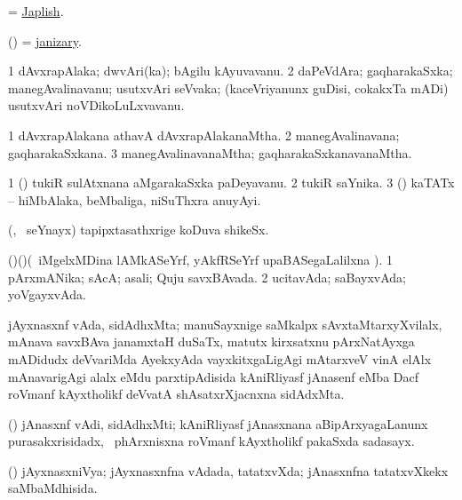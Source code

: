 \bentry
{}
\gl{\nA}
\bmng
=  \hyperlink{Japlish}{Japlish}. 
\emng
\eentry

\bentry
{}
\gl{\nA}
\bmng
(\ca) = \hyperlink{janizary}{janizary}. 
\emng
\eentry


\bentry
{}
\gl{\nA}
\bmng
\bnum
\num{1} dAvxrapAlaka; dwvAri(ka); bAgilu kAyuvavanu. 
\num{2} daPeVdAra; gaqharakaSxka; manegAvalinavanu; usutxvAri seVvaka; (kaceVriyanunx guDisi, cokakxTa mADi) usutxvAri noVDikoLuLxvavanu. 
\enum
\emng
\eentry

\bentry
{}
\gl{\gu}
\bmng
\bnum
\num{1} dAvxrapAlakana athavA dAvxrapAlakanaMtha. 
\num{2} manegAvalinavana; gaqharakaSxkana. 
\num{3} manegAvalinavanaMtha; gaqharakaSxkanavanaMtha. 
\enum
\emng
\eentry

\bentry
{}
\gl{\nA}
\bmng
\bnum
\num{1} (\ca) tukiR sulAtxnana aMgarakaSxka paDeyavanu. 
\num{2} tukiR saYnika. 
\num{3} (\rUpa) kaTATx -- hiMbAlaka, beMbaliga, niSuThxra anuyAyi. 
\enum
\emng
\eentry

\bentry
{}
\gl{\nA}
\bmng
(\ashi, \kanmu\ seYnayx) tapipxtasathxrige koDuva shikeSx. 
\emng
\eentry

\bentry
{}
\gl{\gu}
\bmng
(\birx)(\pArxM)(\kanmu\ iMgelxMDina lAMkASeYrf, yAkfRSeYrf upaBASegaLalilxna \parx). 
\bnum
\num{1} pArxmANika; sAcA; asali; Quju savxBAvada. 
\num{2} ucitavAda; saBayxvAda; yoVgayxvAda. 
\enum
\emng
\eentry

\bentry
{}
\gl{\nA}
\bmng
jAyxnasxnf vAda, sidAdhxMta; manuSayxnige saMkalpx sAvxtaMtarxyXvilalx, mAnava savxBAva janamxtaH duSaTx, matutx kirxsatxnu pArxNatAyxga mADidudx deVvariMda AyekxyAda vayxkitxgaLigAgi mAtarxveV vinA elAlx mAnavarigAgi alalx eMdu parxtipAdisida kAniRliyasf jAnasenf  eMba Dacf roVmanf kAyxtholikf deVvatA shAsatxrXjacnxna sidAdxMta. 
\emng
\eentry

\bentry
{}
\gl{\nA}
\bmng
(\ca) jAnasxnf vAdi, sidAdhxMti; kAniRliyasf jAnasxnana aBipArxyagaLanunx purasakxrisidadx, \kanmu\ phArxnisxna roVmanf kAyxtholikf pakaSxda sadasayx. 
\emng
\eentry

\bentry
{}
\gl{\gu}
\bmng
(\ca) jAyxnasxniVya; jAyxnasxnfna vAdada, tatatxvXda; jAnasxnfna tatatxvXkekx saMbaMdhisida. 
\emng
\eentry

